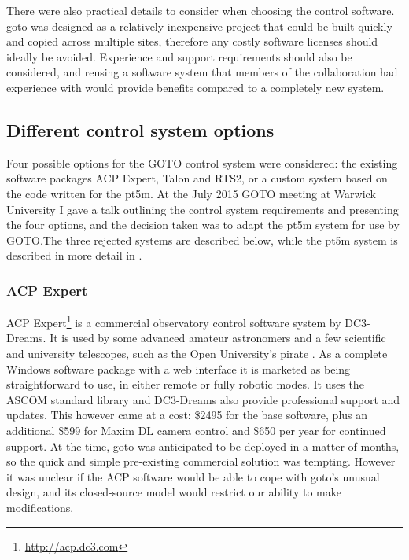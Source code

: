 \begin{colsection}
\begin{colsection}
There were also practical details to consider when choosing the control software. \gls{goto} was designed as a relatively inexpensive project that could be built quickly and copied across multiple sites, therefore any costly software licenses should ideally be avoided. Experience and support requirements should also be considered, and reusing a software system that members of the collaboration had experience with would provide benefits compared to a completely new system.

\end{colsection}


\subsection{Different control system options}
\label{sec:control_options}
\begin{colsection}

Four possible options for the GOTO control system were considered: the existing software packages ACP Expert, Talon and RTS2, or a custom system based on the code written for the \gls{pt5m}. At the July 2015 GOTO meeting at Warwick University I gave a talk outlining the control system requirements and presenting the four options, and the decision taken was to adapt the \gls{pt5m} system for use by GOTO.\@ The three rejected systems are described below, while the \gls{pt5m} system is described in more detail in .

\subsubsection{ACP Expert}
ACP Expert\footnote{\url{http://acp.dc3.com}} is a commercial observatory control software system by DC3-Dreams. It is used by some advanced amateur astronomers and a few scientific and university telescopes, such as the Open University's \gls{pirate} \citep{PIRATE}. As a complete Windows software package with a web interface it is marketed as being straightforward to use, in either remote or fully robotic modes. It uses the ASCOM standard library and DC3-Dreams also provide professional support and updates. This however came at a cost: \$2495 for the base software, plus an additional \$599 for Maxim DL camera control and \$650 per year for continued support. At the time, \gls{goto} was anticipated to be deployed in a matter of months, so the quick and simple pre-existing commercial solution was tempting. However it was unclear if the ACP software would be able to cope with \gls{goto}'s unusual design, and its closed-source model would restrict our ability to make modifications.


\end{colsection}
\end{colsection}

